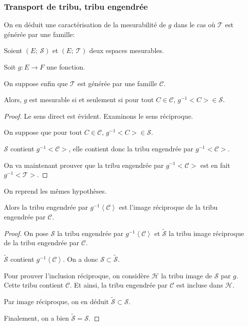 \subsubsection{Transport de tribu, tribu engendrée}

On en déduit une caractérisation de la mesurabilité de $g$ dans le cas où $\mathcal{T}$ est générée par une famille:

\begin{prop}
Soient $(E;~\mathcal{S})$ et $(E;~\mathcal{T})$ deux espaces mesurables.

Soit $g: E \to F$ une fonction.

On suppose enfin que $\mathcal{T}$ est générée par une famille $\mathcal{C}$.

Alors, $g$ est mesurable si et seulement si pour tout $C \in \mathcal{C}$, $g^{-1}<C> \in \mathcal{S}$.
\end{prop}

\begin{proof}
Le sens direct est évident. Examinons le sens réciproque.

On suppose que pour tout $C \in \mathcal{C}$, $g^{-1}<C> \in \mathcal{S}$.

$\mathcal{S}$ contient $g^{-1}<\mathcal{C}>$, elle contient donc la tribu engendrée par $g^{-1}<\mathcal{C}>$.

On va maintenant prouver que la tribu engendrée par $g^{-1}<\mathcal{C}>$ est en fait $g^{-1}<\mathcal{T}>$.
\end{proof}

\begin{lem}
On reprend les mêmes hypothèses.

Alors la tribu engendrée par $g^{-1}\left<\mathcal{C}\right>$ est l'image réciproque de la tribu engendrée par $\mathcal{C}$.
\end{lem}

\begin{proof}
On pose $\mathcal{S}$ la tribu engendrée par $g^{-1}\left<\mathcal{C}\right>$ et $\tilde{\mathcal{S}}$ la tribu image réciproque de la tribu engendrée par $\mathcal{C}$.

$\tilde{\mathcal{S}}$ contient $g^{-1}\left<\mathcal{C}\right>$. On a donc $\mathcal{S} \subset \tilde{\mathcal{S}}$.

Pour prouver l'inclusion réciproque, on considère $\mathcal{H}$ la tribu image de $\mathcal{S}$ par $g$. Cette tribu contient $\mathcal{C}$. Et ainsi, la tribu engendrée par  $\mathcal{C}$ est incluse dans $\mathcal{H}$.

Par image réciproque, on en déduit $\tilde{\mathcal{S}} \subset \mathcal{S}$.

Finalement, on a bien $\tilde{\mathcal{S}} = \mathcal{S}$.
\end{proof}

